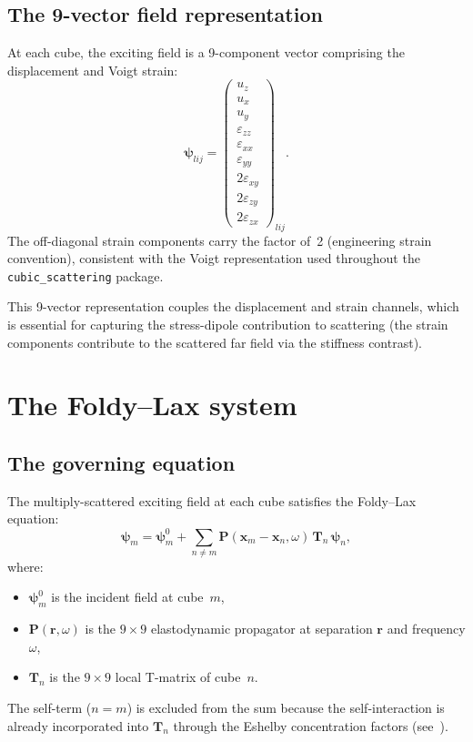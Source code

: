 \documentclass[11pt,a4paper]{article}
\newcommand{\bT}{\bm{T}}
\newcommand{\bP}{\bm{P}}
\begin{document}
\subsection{The 9-vector field representation}

At each cube, the exciting field is a 9-component vector comprising
the displacement and Voigt strain:
\begin{equation}\label{eq:psi}
  \bm{\psi}_{lij} = \begin{pmatrix}
    u_z \\ u_x \\ u_y \\
    \varepsilon_{zz} \\ \varepsilon_{xx} \\ \varepsilon_{yy} \\
    2\varepsilon_{xy} \\ 2\varepsilon_{zy} \\ 2\varepsilon_{zx}
  \end{pmatrix}_{lij}.
\end{equation}
The off-diagonal strain components carry the factor of~2
(engineering strain convention), consistent with the Voigt
representation used throughout the \texttt{cubic\_scattering} package.

This 9-vector representation couples the displacement and strain
channels, which is essential for capturing the stress-dipole
contribution to scattering (the strain components contribute to the
scattered far field via the stiffness contrast).

\section{The Foldy--Lax system}
\label{sec:foldylax}

\subsection{The governing equation}

The multiply-scattered exciting field at each cube satisfies the
Foldy--Lax equation:
\begin{equation}\label{eq:FL}
  \bm{\psi}_m = \bm{\psi}_m^0
    + \sum_{n \neq m} \bP(\bm{x}_m - \bm{x}_n, \omega)\,
      \bT_n\,\bm{\psi}_n,
\end{equation}
where:
\begin{itemize}[nosep]
  \item $\bm{\psi}_m^0$ is the incident field at cube~$m$,
  \item $\bP(\bm{r}, \omega)$ is the $9 \times 9$ elastodynamic
    propagator at separation $\bm{r}$ and frequency $\omega$,
  \item $\bT_n$ is the $9 \times 9$ local T-matrix of cube~$n$.
\end{itemize}
The self-term ($n = m$) is excluded from the sum because the
self-interaction is already incorporated into $\bT_n$ through the
Eshelby concentration factors (see~\cite{gubernatis1977}).
\end{document}
